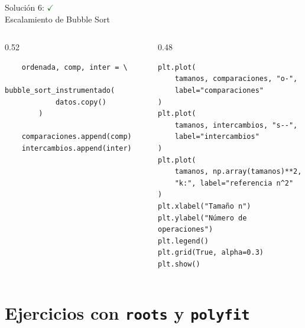 \documentclass[10pt]{beamer}
\begin{document}
\begin{solutionblock}
\begin{frame}[fragile]{Solución 6: \hfill \textcolor{green}{$\checkmark$} \\ Escalamiento de Bubble Sort}
\begin{columns}
\begin{column}{0.52\textwidth}
\begin{verbatim}
    ordenada, comp, inter = \
        bubble_sort_instrumentado(
            datos.copy()
        )

    comparaciones.append(comp)
    intercambios.append(inter)
\end{verbatim}
\end{column}
\begin{column}{0.48\textwidth}
\begin{verbatim}
plt.plot(
    tamanos, comparaciones, "o-",
    label="comparaciones"
)
plt.plot(
    tamanos, intercambios, "s--",
    label="intercambios"
)
plt.plot(
    tamanos, np.array(tamanos)**2,
    "k:", label="referencia n^2"
)
plt.xlabel("Tamaño n")
plt.ylabel("Número de operaciones")
plt.legend()
plt.grid(True, alpha=0.3)
plt.show()
\end{verbatim}
\end{column}
\end{columns}
\end{frame}
\end{solutionblock}

\section{Ejercicios con \texttt{roots} y \texttt{polyfit}}
\end{document}
